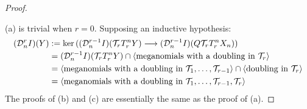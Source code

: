 \documentclass[10pt]{article}
\newcommand{\Comm}{\calC}
\begin{document}
\begin{convergence}
\begin{proof}
\begin{enumerate}
\end{enumerate}
(a) is trivial when $r=0$. Supposing an inductive hypothesis:
\begin{alignat*}{2}
(\caldupdown{r}{n}I)(Y)
&:=
\ker((\caldupdown{r-1}{n}I)(\calT_r T_r^n Y)\to (\caldupdown{r-1}{n}I) (Q\calT_rT_r^n X_n))%
\\
&=
(\caldupdown{r-1}{n}I)(\calT_r T_r^n Y)\cap\langle \textup{meganomials with a doubling in $\calT_r$}\rangle\\
&=
\langle \textup{meganomials with a doubling in $\calT_1,\ldots,\calT_{r-1}$}\rangle\cap\langle \textup{doubling in $\calT_r$}\rangle\\
&=
\langle \textup{meganomials with a doubling in $\calT_1,\ldots,\calT_{r-1},\calT_{r}$}\rangle
\end{alignat*}
The proofs of (b) and (c) are essentially the same as the proof of (a).
\end{proof}





\end{convergence}
\end{document}
